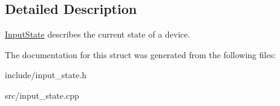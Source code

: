 \subsection{Detailed Description}
\hyperlink{struct_blade_1_1_input_state}{Input\+State} describes the current state of a device. 

The documentation for this struct was generated from the following files\+:\begin{DoxyCompactItemize}
\item 
include/input\+\_\+state.\+h\item 
src/input\+\_\+state.\+cpp\end{DoxyCompactItemize}
